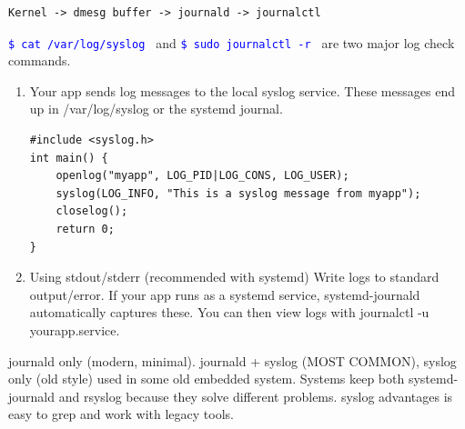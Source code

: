 \documentclass[paper=8.5in:11in, twoside, 12pt, pagesize=pdftex]{book}
\newcommand{\linuxcommand}[1]{\texttt{\textcolor{blue}{\$ #1 \Pisymbol{psy}{191}}}}
\begin{document}
\begin{lstlisting}
Kernel -> dmesg buffer -> journald -> journalctl
\end{lstlisting}
              
	\par \linuxcommand{cat /var/log/syslog} and \linuxcommand{sudo journalctl -r}  are two major log check commands.
	
\begin{enumerate}
	\item Your app sends log messages to the local syslog service. These messages end up in /var/log/syslog or the systemd journal.

\begin{lstlisting}
#include <syslog.h>
int main() {
	openlog("myapp", LOG_PID|LOG_CONS, LOG_USER);
	syslog(LOG_INFO, "This is a syslog message from myapp");
	closelog();
	return 0;
}
\end{lstlisting}	

	\item Using stdout/stderr (recommended with systemd) Write logs to standard output/error. If your app runs as a systemd service, systemd-journald automatically captures these. You can then view logs with journalctl -u yourapp.service.
\end{enumerate}

	\par journald only (modern, minimal).  journald + syslog (MOST COMMON), syslog only (old style) used in some old embedded system. Systems keep both systemd-journald and rsyslog because they solve different problems. syslog advantages is easy to grep and work with legacy tools.
	
\end{document}
